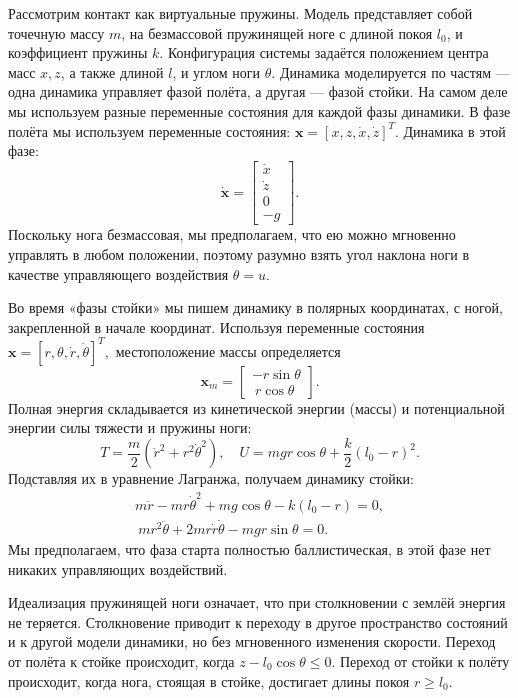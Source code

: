 Рассмотрим контакт как виртуальные пружины.
Модель представляет собой точечную массу $m$, на безмассовой пружинящей ноге с длиной покоя $l_0$, и коэффициент пружины $k$. Конфигурация системы задаётся положением центра масс $x, z$, а также длиной $l$, и углом ноги $\theta$. Динамика моделируется по частям --- одна динамика управляет фазой полёта, а другая --- фазой стойки. На самом деле мы используем разные переменные состояния для каждой фазы динамики. В фазе полёта мы используем переменные состояния: $\mathbf{x} = [x,z,\dot{x},\dot{z}]^T$. Динамика в этой фазе:
\begin{equation}
	\dot{\mathbf{x}} =
	\begin{bmatrix} \dot{x} \\ \dot{z} \\ 0 \\ - g \end{bmatrix}.
\end{equation}
Поскольку нога безмассовая, мы предполагаем, что ею можно мгновенно управлять в любом положении, поэтому разумно взять угол наклона ноги в качестве управляющего воздействия $\theta = u$.

Во время «фазы стойки» мы пишем динамику в полярных координатах, с ногой, закрепленной в начале координат. Используя переменные состояния $\mathbf{x} = [r, \theta, \dot{r}, \dot\theta]^T,$ 
местоположение массы определяется $$\mathbf{x}_m = \begin{bmatrix} - r \sin\theta \\\ r \cos\theta \end{bmatrix}. $$ Полная энергия складывается из кинетической энергии (массы) и потенциальной энергии силы тяжести и пружины ноги: $$T = \frac{m}{2} (\dot{r}^2 + r^2 \dot\theta^2 ), \quad U = mgr\cos\theta + \frac{k}{2}(l_0 - r)^2. $$ Подставляя их в уравнение Лагранжа, получаем динамику стойки: 
\begin{gather*} 
	m \ddot{r} - m r \dot\theta^2 + m g \cos\theta - k (l_0 - r) = 0, \\\ 
	m r^2 \ddot{\theta} + 2mr\dot{r}\dot\theta - mgr \sin\theta = 0.
\end{gather*} 
Мы предполагаем, что фаза старта полностью баллистическая, в этой фазе нет никаких управляющих воздействий.

Идеализация пружинящей ноги означает, что при столкновении с землёй энергия не теряется. Столкновение приводит к переходу в другое пространство состояний и к другой модели динамики, но без мгновенного изменения скорости. Переход от полёта к стойке происходит, когда $z -
l_0\cos\theta \le 0.$  Переход от стойки к полёту происходит, когда нога, стоящая в стойке, достигает длины покоя $r \ge l_0$.

